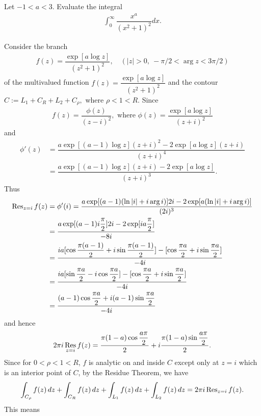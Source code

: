 \begin{problem}
Let $-1<a<3.$ Evaluate the integral 
\begin{align*}
    \int_0^\infty \dfrac{x^a}{(x^2+1)^2}dx.
\end{align*}
\begin{solution}
Consider the branch 
\begin{align*}
    f(z)=\dfrac{\exp[a\log z]}{(z^2+1)^2},\quad (|z|> 0,\ -\pi/2 < \arg z< 3\pi/2)
\end{align*}
of the multivalued function $f(z)=\dfrac{\exp[a\log z]}{(z^2+1)^2}$ and the contour $C:=L_1+C_R+L_2+C_\rho,$ where $\rho<1<R.$
Since 
\begin{align*}
    f(z)=\dfrac{\phi(z)}{(z-i)^2},\text{ where }\phi(z)=\dfrac{\exp[a\log z]}{(z+i)^2}
\end{align*}
and 
\begin{align*}
    \phi'(z)&=\dfrac{a\exp[(a-1)\log z](z+i)^2-2\exp[a\log z](z+i)}{(z+i)^4}\\
    &=\dfrac{a\exp[(a-1)\log z](z+i)-2\exp[a\log z]}{(z+i)^3}.
\end{align*}
Thus 
\begin{align*}
    \operatorname{Res}_{z=i}f(z) &= \phi'(i) = \dfrac{a\exp[(a-1)(\ln |i| + i\arg i)] 2i - 2\exp[a(\ln |i| + i\arg i)]}{(2i)^3} \\
    &=\dfrac{a\exp[(a-1)i\dfrac{\pi}{2} ] 2i-2\exp[ia\dfrac{\pi}{2} ]}{-8i}\\
    &=\dfrac{ia[\cos\dfrac{\pi(a-1)}{2}+i\sin\dfrac{\pi(a-1)}{2} ] -[\cos\dfrac{\pi a }{2}+i\sin\dfrac{\pi a }{2} ]}{-4i}\\
    &=\dfrac{ia[\sin\dfrac{\pi a}{2}-i\cos\dfrac{\pi a}{2} ] -[\cos\dfrac{\pi a }{2}+i\sin\dfrac{\pi a }{2} ]}{-4i}\\
    &=\dfrac{(a-1)\cos\dfrac{\pi a }{2}+i(a-1)\sin\dfrac{\pi a }{2} }{-4i}
\end{align*}
and hence
\begin{align*}
    2\pi i\mathop{\rm Res}_{z=i}f(z)=\dfrac{\pi (1-a)\cos\dfrac{a\pi}{2}}{2}+i\dfrac{\pi (1-a)\sin\dfrac{a\pi}{2}}{2}.
\end{align*}
Since for $0 < \rho < 1 < R$, $f$ is analytic on and inside $C$ except only at $z=i$ which is an interior point of $C$, by the Residue Theorem, we have 
\begin{align*}
    \int_{C_\rho} f(z) \,dz + \int_{C_R} f(z) \,dz + \int_{L_1} f(z) \,dz + \int_{L_2} f(z) \,dz = 2\pi i\operatorname{Res}_{z=i} f(z).
\end{align*}
This means 
\begin{align*}

\end{align*}
\end{solution}
\end{problem}
